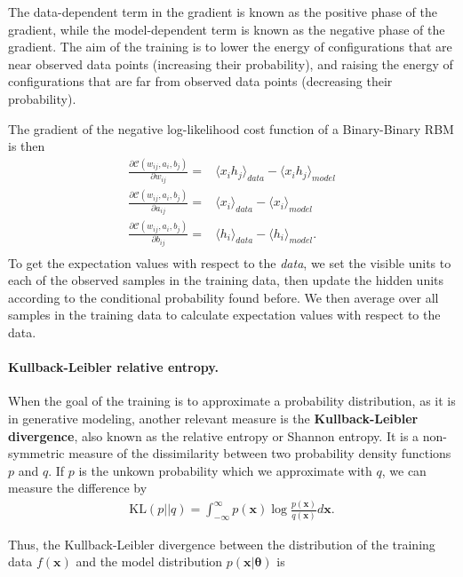 \documentclass[%
oneside,                 %
final,                   %
10pt]{article}
\begin{document}
The data-dependent term in the gradient is known as the positive phase
of the gradient, while the model-dependent term is known as the
negative phase of the gradient. The aim of the training is to lower
the energy of configurations that are near observed data points
(increasing their probability), and raising the energy of
configurations that are far from observed data points (decreasing
their probability).

The gradient of the negative log-likelihood cost function of a Binary-Binary RBM is then
\begin{align}
	\frac{\partial \mathcal{C} (w_{ij}, a_i, b_j)}{\partial w_{ij}} =& \langle x_i h_j \rangle_{data} - \langle x_i h_j \rangle_{model} \\
	\frac{\partial \mathcal{C} (w_{ij}, a_i, b_j)}{\partial a_{ij}} =& \langle x_i \rangle_{data} - \langle x_i \rangle_{model} \\
	\frac{\partial \mathcal{C} (w_{ij}, a_i, b_j)}{\partial b_{ij}} =& \langle h_i \rangle_{data} - \langle h_i \rangle_{model}. \\
\end{align}
To get the expectation values with respect to the \emph{data}, we set the visible units to each of the observed samples in the training data, then update the hidden units according to the conditional probability found before. We then average over all samples in the training data to calculate expectation values with respect to the data. 

\paragraph{Kullback-Leibler relative entropy.}
When the goal of the training is to approximate a probability
distribution, as it is in generative modeling, another relevant
measure is the \textbf{Kullback-Leibler divergence}, also known as the
relative entropy or Shannon entropy. It is a non-symmetric measure of the
dissimilarity between two probability density functions $p$ and
$q$. If $p$ is the unkown probability which we approximate with $q$,
we can measure the difference by
\begin{align}
	\text{KL}(p||q) = \int_{-\infty}^{\infty} p (\bm{x}) \log \frac{p(\bm{x})}{q(\bm{x})}  d\bm{x}.
\end{align}

Thus, the Kullback-Leibler divergence between the distribution of the
training data $f(\bm{x})$ and the model distribution $p(\bm{x}|
\bm{\theta})$ is
\end{document}
